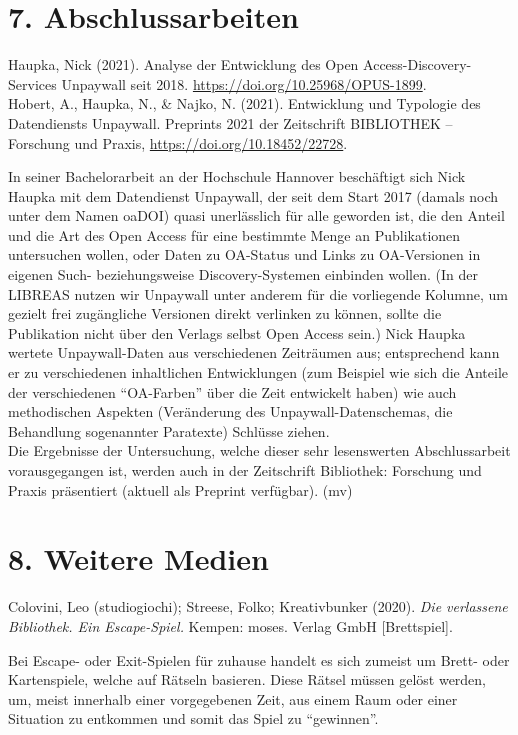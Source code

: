 \documentclass[a4paper,
fontsize=11pt,
oneside,
numbers=noperiodatend,
parskip=half-,
bibliography=totoc,
final
]{scrartcl}
\begin{document}
\hypertarget{abschlussarbeiten}{%
\section{7. Abschlussarbeiten}\label{abschlussarbeiten}}

Haupka, Nick (2021). Analyse der Entwicklung des Open
Access-Discovery-Services Unpaywall seit 2018.
\url{https://doi.org/10.25968/OPUS-1899}.\\
Hobert, A., Haupka, N., \& Najko, N. (2021). Entwicklung und Typologie
des Datendiensts Unpaywall. Preprints 2021 der Zeitschrift BIBLIOTHEK --
Forschung und Praxis, \url{https://doi.org/10.18452/22728}.

In seiner Bachelorarbeit an der Hochschule Hannover beschäftigt sich
Nick Haupka mit dem Datendienst Unpaywall, der seit dem Start 2017
(damals noch unter dem Namen oaDOI) quasi unerlässlich für alle geworden
ist, die den Anteil und die Art des Open Access für eine bestimmte Menge
an Publikationen untersuchen wollen, oder Daten zu OA-Status und Links
zu OA-Versionen in eigenen Such- beziehungsweise Discovery-Systemen
einbinden wollen. (In der LIBREAS nutzen wir Unpaywall unter anderem für
die vorliegende Kolumne, um gezielt frei zugängliche Versionen direkt
verlinken zu können, sollte die Publikation nicht über den Verlags
selbst Open Access sein.) Nick Haupka wertete Unpaywall-Daten aus
verschiedenen Zeiträumen aus; entsprechend kann er zu verschiedenen
inhaltlichen Entwicklungen (zum Beispiel wie sich die Anteile der
verschiedenen \enquote{OA-Farben} über die Zeit entwickelt haben) wie
auch methodischen Aspekten (Veränderung des Unpaywall-Datenschemas, die
Behandlung sogenannter Paratexte) Schlüsse ziehen.\\
Die Ergebnisse der Untersuchung, welche dieser sehr lesenswerten
Abschlussarbeit vorausgegangen ist, werden auch in der Zeitschrift
Bibliothek: Forschung und Praxis präsentiert (aktuell als Preprint
verfügbar). (mv)

\hypertarget{weitere-medien}{%
\section{8. Weitere Medien}\label{weitere-medien}}

Colovini, Leo (studiogiochi); Streese, Folko; Kreativbunker (2020).
\emph{Die verlassene Bibliothek. Ein Escape-Spiel.} Kempen: moses.
Verlag GmbH {[}Brettspiel{]}.

Bei Escape- oder Exit-Spielen für zuhause handelt es sich zumeist um
Brett- oder Kartenspiele, welche auf Rätseln basieren. Diese Rätsel
müssen gelöst werden, um, meist innerhalb einer vorgegebenen Zeit, aus
einem Raum oder einer Situation zu entkommen und somit das Spiel zu
\enquote{gewinnen}.
\end{document}
